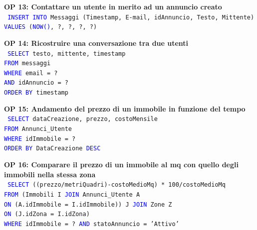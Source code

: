 \documentclass[a4paper,12pt]{report}
\begin{document}
            \noindent
            \textbf{OP 13: Contattare un utente in merito ad un annuncio creato} \\
            \texttt{
                \textcolor{blue}{INSERT INTO} Messaggi (Timestamp, E-mail, idAnnuncio, Testo, Mittente) \\
                \textcolor{blue}{VALUES} (\textcolor{blue}{NOW()}, ?, ?, ?, ?) \\
            } 

            \noindent
            \textbf{OP 14: Ricostruire una conversazione tra due utenti} \\
            \texttt{
                \textcolor{blue}{SELECT} testo, mittente, timestamp \\
                \textcolor{blue}{FROM} messaggi \\
                \textcolor{blue}{WHERE} email = ? \\
                \textcolor{blue}{AND} idAnnuncio = ? \\
                \textcolor{blue}{ORDER BY} timestamp \\
            }

            \noindent
            \textbf{OP 15: Andamento del prezzo di un immobile in funzione del tempo} \\
            \texttt{
                \textcolor{blue}{SELECT} dataCreazione, prezzo, costoMensile \\
                \textcolor{blue}{FROM} Annunci\_Utente \\
                \textcolor{blue}{WHERE} idImmobile = ? \\
                \textcolor{blue}{ORDER BY} DataCreazione \textcolor{blue}{DESC} \\
            }
            
            \noindent
            \textbf{OP 16: Comparare il prezzo di un immobile al mq con quello degli immobili nella stessa zona} \\
            \texttt{
                \textcolor{blue}{SELECT} ((prezzo/metriQuadri)-costoMedioMq) * 100/costoMedioMq \\
                \textcolor{blue}{FROM} (Immobili I \textcolor{blue}{JOIN} Annunci\_Utente A  \\
                \textcolor{blue}{ON} (A.idImmobile = I.idImmobile)) J \textcolor{blue}{JOIN} Zone Z \\
                \textcolor{blue}{ON} (J.idZona = I.idZona) \\
                \textcolor{blue}{WHERE} idImmobile = ? \textcolor{blue}{AND} statoAnnuncio = 'Attivo' \\
            }
            
\end{document}
